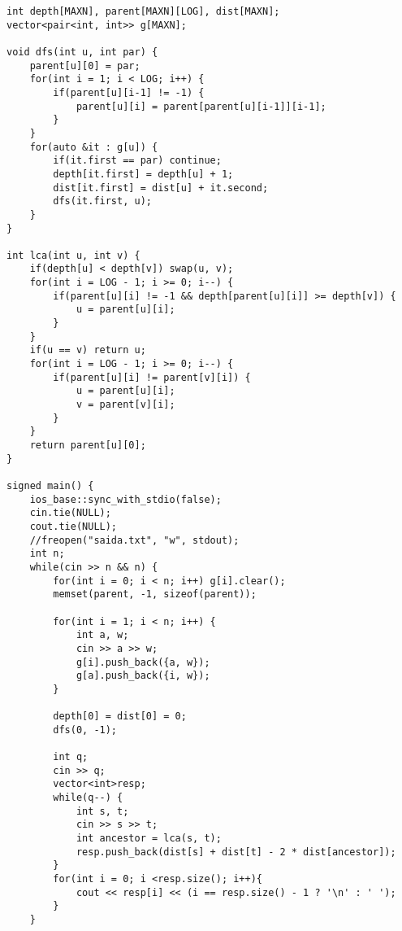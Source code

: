 \begin{lstlisting}
int depth[MAXN], parent[MAXN][LOG], dist[MAXN];
vector<pair<int, int>> g[MAXN];

void dfs(int u, int par) {
    parent[u][0] = par;
    for(int i = 1; i < LOG; i++) {
        if(parent[u][i-1] != -1) {
            parent[u][i] = parent[parent[u][i-1]][i-1];
        }
    }
    for(auto &it : g[u]) {
        if(it.first == par) continue;
        depth[it.first] = depth[u] + 1;
        dist[it.first] = dist[u] + it.second;
        dfs(it.first, u);
    }
}

int lca(int u, int v) {
    if(depth[u] < depth[v]) swap(u, v);
    for(int i = LOG - 1; i >= 0; i--) {
        if(parent[u][i] != -1 && depth[parent[u][i]] >= depth[v]) {
            u = parent[u][i];
        }
    }
    if(u == v) return u;
    for(int i = LOG - 1; i >= 0; i--) {
        if(parent[u][i] != parent[v][i]) {
            u = parent[u][i];
            v = parent[v][i];
        }
    }
    return parent[u][0];
}

signed main() {
    ios_base::sync_with_stdio(false);
    cin.tie(NULL);
    cout.tie(NULL);
    //freopen("saida.txt", "w", stdout);
    int n;
    while(cin >> n && n) {
        for(int i = 0; i < n; i++) g[i].clear();
        memset(parent, -1, sizeof(parent));
        
        for(int i = 1; i < n; i++) {
            int a, w;
            cin >> a >> w;
            g[i].push_back({a, w});
            g[a].push_back({i, w});
        }
        
        depth[0] = dist[0] = 0;
        dfs(0, -1);
        
        int q;
        cin >> q;
        vector<int>resp;
        while(q--) {
            int s, t;
            cin >> s >> t;
            int ancestor = lca(s, t);
            resp.push_back(dist[s] + dist[t] - 2 * dist[ancestor]);
        }
        for(int i = 0; i <resp.size(); i++){
            cout << resp[i] << (i == resp.size() - 1 ? '\n' : ' ');
        }
    }
\end{lstlisting}